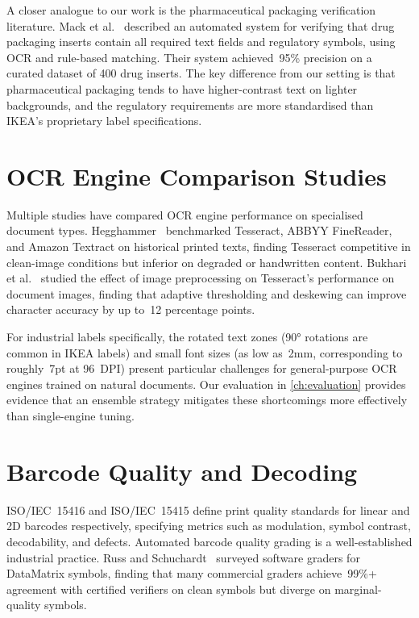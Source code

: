 A closer analogue to our work is the pharmaceutical packaging verification literature.
Mack et al.~\cite{mack2017pharmaceutical} described an automated system for verifying
that drug packaging inserts contain all required text fields and regulatory symbols, using
\ac{OCR} and rule-based matching. Their system achieved~95\% precision on a curated
dataset of 400 drug inserts. The key difference from our setting is that pharmaceutical
packaging tends to have higher-contrast text on lighter backgrounds, and the regulatory
requirements are more standardised than IKEA's proprietary label specifications.

\section{OCR Engine Comparison Studies}

Multiple studies have compared \ac{OCR} engine performance on specialised document
types. Hegghammer~\cite{hegghammer2022ocr} benchmarked Tesseract, ABBYY FineReader,
and Amazon Textract on historical printed texts, finding Tesseract competitive in clean-image
conditions but inferior on degraded or handwritten content. Bukhari et al.~\cite{bukhari2012improved}
studied the effect of image preprocessing on Tesseract's performance on document images,
finding that adaptive thresholding and deskewing can improve character accuracy by up to~12
percentage points.

For industrial labels specifically, the rotated text zones (90° rotations are common in IKEA
labels) and small font sizes (as low as~2mm, corresponding to roughly~7pt at 96~DPI)
present particular challenges for general-purpose \ac{OCR} engines trained on natural
documents. Our evaluation in \cref{ch:evaluation} provides evidence that an ensemble
strategy mitigates these shortcomings more effectively than single-engine tuning.

\section{Barcode Quality and Decoding}

ISO/IEC~15416 and ISO/IEC~15415 define print quality standards for linear and 2D barcodes
respectively, specifying metrics such as modulation, symbol contrast, decodability, and
defects. Automated barcode quality grading is a well-established industrial practice.
Russ and Schuchardt~\cite{russ2020barcode} surveyed software graders for DataMatrix
symbols, finding that many commercial graders achieve~99\%+ agreement with certified
verifiers on clean symbols but diverge on marginal-quality symbols.

